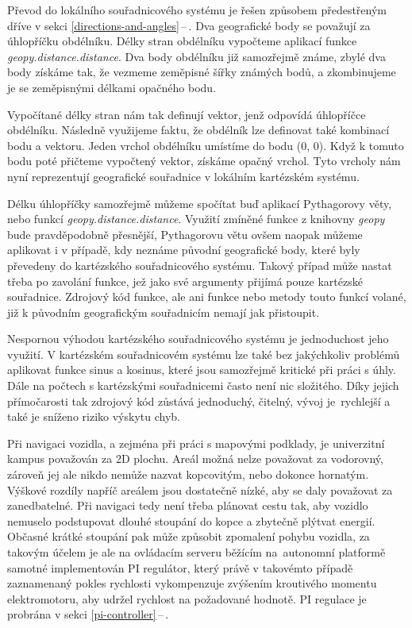 \documentclass[czech, bachelor]{diploma}
\newcommand{\filipref}[1]{\ref{#1}\,--\,\nameref{#1}}
\begin{document}
Převod do lokálního souřadnicového systému je řešen způsobem předestřeným dříve v sekci \filipref{directions-and-angles}. Dva
geografické body se považují za úhlopříčku obdélníku. Délky stran obdélníku vypočteme aplikací funkce
\emph{geopy.distance.distance}. Dva body obdélníku již samozřejmě známe, zbylé dva body získáme tak, že vezmeme zeměpisné šířky
známých bodů, a zkombinujeme je se zeměpisnými délkami opačného bodu.

Vypočítané délky stran nám tak definují vektor, jenž odpovídá úhlopříčce obdélníku. Následně využijeme faktu, že obdélník lze
definovat také kombinací bodu a vektoru. Jeden vrchol obdélníku umístíme do bodu (0, 0). Když k tomuto bodu poté přičteme
vypočtený vektor, získáme opačný vrchol. Tyto vrcholy nám nyní reprezentují geografické souřadnice v lokálním kartézském systému.

Délku úhlopříčky samozřejmě můžeme spočítat buď aplikací Pythagorovy věty, nebo funkcí \emph{geopy.distance.distance}. Využití
zmíněné funkce z knihovny \emph{geopy} bude pravděpodobně přesnější, Pythagorovu větu ovšem naopak můžeme aplikovat i v případě,
kdy neznáme původní geografické body, které byly převedeny do kartézského souřadnicového systému. Takový případ může nastat třeba
po zavolání funkce, jež jako své argumenty přijímá pouze kartézské souřadnice. Zdrojový kód funkce, ale ani funkce nebo metody
touto funkcí volané, již k původním geografickým souřadnicím nemají jak přistoupit.

Nespornou výhodou kartézského souřadnicového systému je jednoduchost jeho využití. V kartézském souřadnicovém systému lze také
bez jakýchkoliv problémů aplikovat funkce sinus a kosinus, které jsou samozřejmě kritické při práci s úhly. Dále na počtech
s kartézskými souřadnicemi často není nic složitého. Díky jejich přímočarosti tak zdrojový kód zůstává jednoduchý, čitelný,
vývoj je~rychlejší a také je sníženo riziko výskytu chyb.

Při navigaci vozidla, a zejména při práci s mapovými podklady, je univerzitní kampus považován za 2D plochu. Areál možná nelze
považovat za vodorovný, zároveň jej ale nikdo nemůže nazvat kopcovitým, nebo dokonce hornatým. Výškové rozdíly napříč areálem jsou
dostatečně nízké, aby se daly považovat za zanedbatelné. Při navigaci tedy není třeba plánovat cestu tak, aby vozidlo nemuselo
podstupovat dlouhé stoupání do kopce a zbytečně plýtvat energií. Občasné krátké stoupání pak může způsobit zpomalení pohybu
vozidla, za takovým účelem je ale na ovládacím serveru běžícím na~autonomní platformě samotné implementován PI regulátor, který
právě v takovémto případě zaznamenaný pokles rychlosti vykompenzuje zvýšením kroutivého momentu elektromotoru, aby udržel rychlost
na požadované hodnotě. PI regulace je probrána v sekci \filipref{pi-controller}.
\end{document}
